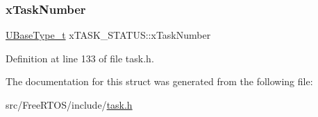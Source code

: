 \subsubsection{\texorpdfstring{x\+Task\+Number}{xTaskNumber}}
{\footnotesize\ttfamily \hyperlink{portmacro_8h_a646f89d4298e4f5afd522202b11cb2e6}{U\+Base\+Type\+\_\+t} x\+T\+A\+S\+K\+\_\+\+S\+T\+A\+T\+U\+S\+::x\+Task\+Number}



Definition at line 133 of file task.\+h.



The documentation for this struct was generated from the following file\+:\begin{DoxyCompactItemize}
\item 
src/\+Free\+R\+T\+O\+S/include/\hyperlink{task_8h}{task.\+h}\end{DoxyCompactItemize}
